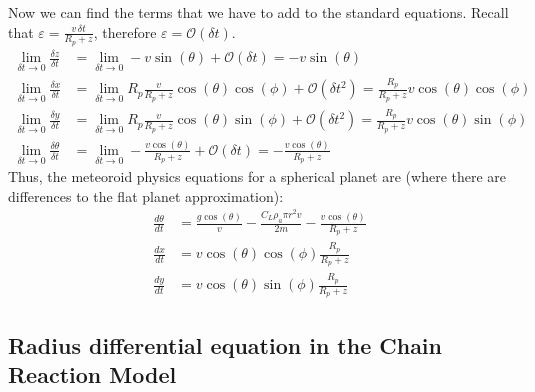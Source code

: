 Now we can find the terms that we have to add to the standard equations. Recall that $\varepsilon = \frac{v\,\delta t}{R_p + z}$, therefore $\varepsilon = \mathcal{O}(\delta t)$.
\begin{align}
    \lim_{\delta t \rightarrow 0} \frac{\delta z}{\delta t} &= \lim_{\delta t \rightarrow 0} -v\sin(\theta) + \mathcal{O}(\delta t) = -v\sin(\theta) \\
    \lim_{\delta t \rightarrow 0} \frac{\delta x}{\delta t} &= \lim_{\delta t \rightarrow 0} R_p \frac{v}{R_p + z}\cos(\theta)\cos(\phi) + \mathcal{O}(\delta t^2) = \frac{R_p}{R_p + z}v\cos(\theta)\cos(\phi) \\
    \lim_{\delta t \rightarrow 0} \frac{\delta y}{\delta t} &= \lim_{\delta t \rightarrow 0} R_p \frac{v}{R_p + z}\cos(\theta)\sin(\phi) + \mathcal{O}(\delta t^2) = \frac{R_p}{R_p + z}v\cos(\theta)\sin(\phi) \\
    \lim_{\delta t \rightarrow 0} \frac{\delta\theta}{\delta t} &= \lim_{\delta t \rightarrow 0} -\frac{v\cos(\theta)}{R_p+z} + \mathcal{O}(\delta t) = -\frac{v\cos(\theta)}{R_p+z}
\end{align}
Thus, the meteoroid physics equations for a spherical planet are (where there are differences to the flat planet approximation):
\begin{align}
    \frac{d\theta}{dt} &= \frac{g\cos(\theta)}{v} - \frac{C_L \rho_a \pi r^2 v}{2m} - \frac{v\cos(\theta)}{R_p + z} \\
    \frac{dx}{dt} &= v\cos(\theta)\cos(\phi) \frac{R_p}{R_p + z} \\
    \frac{dy}{dt} &= v\cos(\theta)\sin(\phi) \frac{R_p}{R_p + z}
\end{align}

\subsection{Radius differential equation in the Chain Reaction Model}

